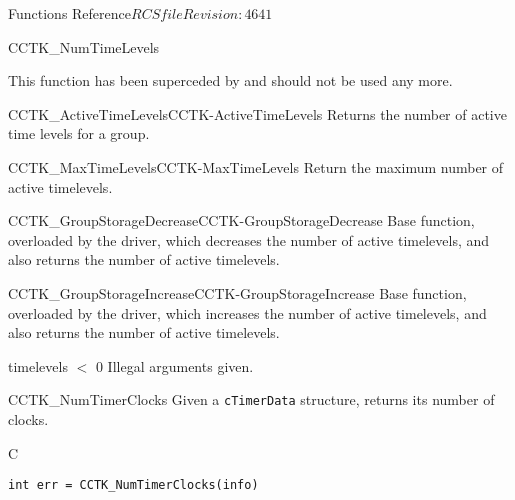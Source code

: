 \begin{cactuspart}{ Functions Reference}{$RCSfile$}{$Revision: 4641 $}
\begin{FunctionDescription}{CCTK\_NumTimeLevels}
\begin{Discussion}
This function has been superceded by  and
should not be used any more.
\end{Discussion}

\begin{SeeAlsoSection}
\begin{SeeAlso2}{CCTK\_ActiveTimeLevels}{CCTK-ActiveTimeLevels}
Returns the number of active time levels for a group.
\end{SeeAlso2}
\begin{SeeAlso2}{CCTK\_MaxTimeLevels}{CCTK-MaxTimeLevels}
Return the maximum number of active timelevels.
\end{SeeAlso2}
\begin{SeeAlso2}{CCTK\_GroupStorageDecrease}{CCTK-GroupStorageDecrease}
Base function, overloaded by the driver, which decreases the number of
active timelevels, and also returns the number of active timelevels.
\end{SeeAlso2}
\begin{SeeAlso2}{CCTK\_GroupStorageIncrease}{CCTK-GroupStorageIncrease}
Base function, overloaded by the driver, which increases the number of
active timelevels, and also returns the number of active timelevels.
\end{SeeAlso2}
\end{SeeAlsoSection}

\begin{ErrorSection}
\begin{Error}{timelevels $<$ 0}
Illegal arguments given.
\end{Error}
\end{ErrorSection}

\end{FunctionDescription}


\begin{FunctionDescription}{CCTK\_NumTimerClocks}
\label{CCTK-NumTimerClocks}
Given a {\tt cTimerData} structure, returns its number of clocks.
\begin{SynopsisSection}
\begin{Synopsis}{C}
\begin{verbatim}
int err = CCTK_NumTimerClocks(info)
\end{verbatim}
\end{Synopsis}
\end{SynopsisSection}


\end{FunctionDescription}
\end{cactuspart}
